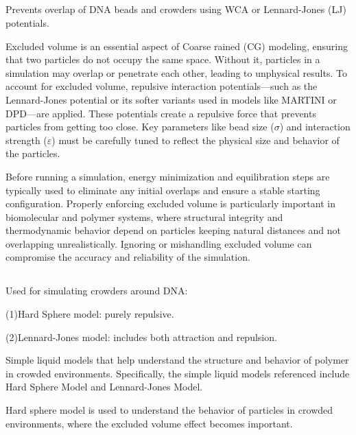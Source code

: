 \documentclass[12pt]{article}
\begin{document}
\begin{flushleft}
    
  \subsection*{}

   \indent\indent Prevents overlap of DNA beads and crowders using WCA or Lennard-Jones (LJ) potentials.
   
   Excluded volume is an essential aspect of Coarse rained (CG) modeling, ensuring that two particles do not occupy the same space. Without it, particles in a simulation may overlap or penetrate each other, leading to unphysical results. To account for excluded volume, repulsive interaction potentials—such as the Lennard-Jones potential or its softer variants used in models like MARTINI or DPD—are applied. These potentials create a repulsive force that prevents particles from getting too close. Key parameters like bead size ($\sigma$) and interaction strength ($\varepsilon$) must be carefully tuned to reflect the physical size and behavior of the particles.

Before running a simulation, energy minimization and equilibration steps are typically used to eliminate any initial overlaps and ensure a stable starting configuration. Properly enforcing excluded volume is particularly important in biomolecular and polymer systems, where structural integrity and thermodynamic behavior depend on particles keeping natural distances and not overlapping unrealistically. Ignoring or mishandling excluded volume can compromise the accuracy and reliability of the simulation.


\subsection*{}

   \indent\indent Used for simulating crowders around DNA:

       \indent\indent (1)Hard Sphere model: purely repulsive.

      \indent\indent (2)Lennard-Jones model: includes both attraction and repulsion.
      
      
Simple liquid models that help understand the structure and behavior of polymer in crowded environments. Specifically, the simple liquid models referenced include Hard Sphere Model and Lennard-Jones Model. 

Hard sphere model is used to understand the behavior of particles in crowded environments, where the excluded volume effect becomes important. 


\end{flushleft}
\end{document}

